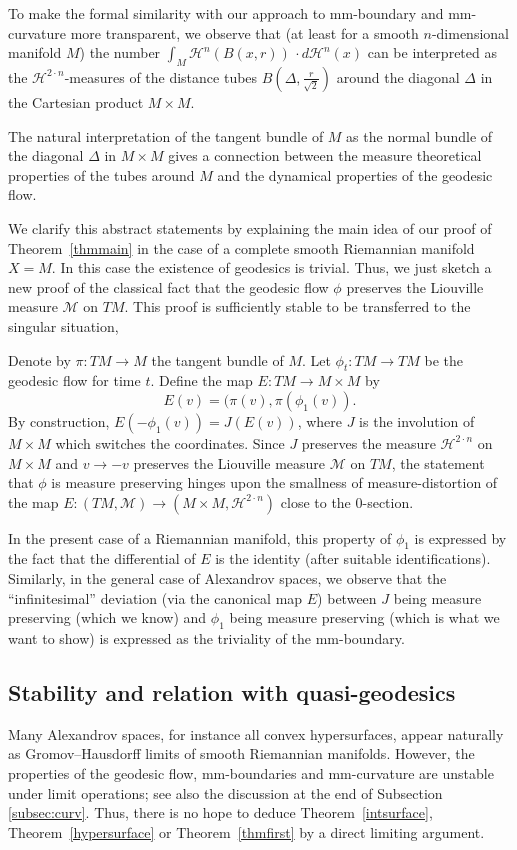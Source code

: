 \documentclass[12pt,leqno,intlimits]{amsart}
\numberwithin{equation}{section}
\theoremstyle{definition}
\theoremstyle{remark}
\newcommand{\tref}[1]{Theorem~\ref{#1}}
\def\:{\colon}
\begin{document}
To make the formal similarity with our approach to mm-boundary and mm-curvature more transparent, we observe that
(at least for a smooth $n$-dimensional manifold $M$) the number $\int _M \mathcal H^n (B(x,r))\, \cdot d\mathcal H^n (x)$ can be interpreted as the $\mathcal H^{2\cdot n}$-measures
of the distance tubes $B(\Delta,{\frac r {\sqrt 2} })$ around the diagonal $\Delta $ in the Cartesian product $M\times M$.

The natural interpretation of the tangent bundle of $M$ as the normal bundle of the diagonal $\Delta$ in $M\times M$ gives a connection between
the measure theoretical properties of the tubes around $M$ and the dynamical properties of the geodesic flow.

We clarify this abstract statements by explaining the main idea of our proof of \tref{thmmain} in the case of a complete smooth Riemannian manifold $X=M$.
In this case the existence of geodesics is trivial.
Thus, we just sketch a new proof of the classical fact that the geodesic flow $\phi$ preserves the Liouville measure $\mathcal M$ on $TM$.
This proof is sufficiently stable to be transferred to the singular situation,

Denote by $\pi\: TM\to M$ the tangent bundle of $M$.
Let $\phi_t\: TM\to TM$ be the geodesic flow for time $t$.
Define the map $E\:TM\to M\times M$ by
\[E(v)=(\pi(v), \pi (\phi _1 (v)).\]
By construction, $E(-\phi_1(v))= J(E(v))$,
where $J$ is the involution of $M\times M$ which switches the coordinates.
Since $J$ preserves the measure $\mathcal H^{2\cdot n}$ on $M\times M$ and $v\to -v$ preserves the Liouville measure $\mathcal M$ on $TM$,
the statement that $\phi$ is measure preserving hinges upon the smallness of measure-distortion of the map $E \:(TM,\mathcal M) \to (M\times M, \mathcal H^{2\cdot n})$ close to the $0$-section.

In the present case of a Riemannian manifold,
this property of $\phi_1$ is expressed by the fact that the differential of $E$ is the identity (after suitable identifications).
Similarly,
in the general case of Alexandrov spaces, we observe that the ``infinitesimal'' deviation (via the canonical map $E$) between $J$ being measure preserving (which we know) and $\phi _1$ being measure preserving (which is what we want to show)
is expressed as the triviality of the mm-boundary.

\subsection{Stability and relation with quasi-geodesics}
Many Alexandrov spaces, for instance all convex hypersurfaces, appear naturally as Gromov--Hausdorff limits of smooth Riemannian manifolds. However, the properties of the geodesic flow, mm-boundaries and mm-curvature are unstable under limit operations; see also the discussion at the end of Subsection \ref{subsec:curv}.
Thus, there is no hope to deduce \tref{intsurface}, \tref{hypersurface} or \tref{thmfirst} by a direct limiting argument.
\end{document}
